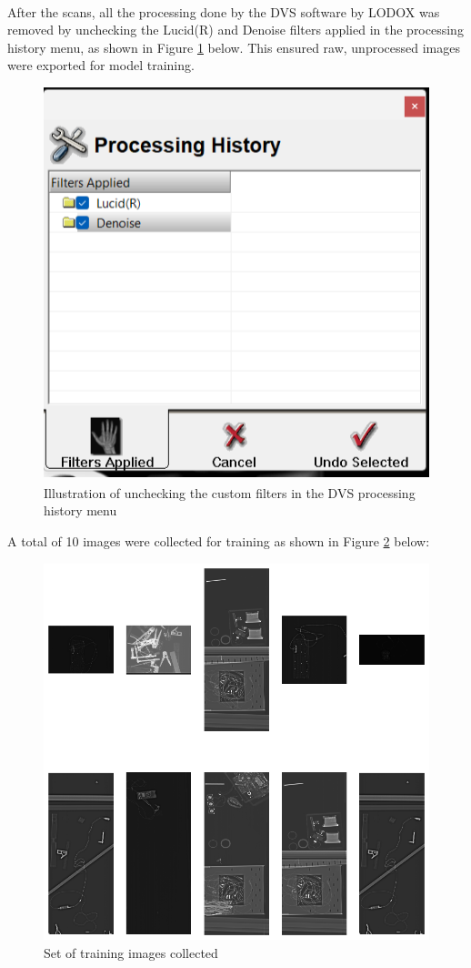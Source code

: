 After the scans, all the processing done by the DVS\textsuperscript{\textregistered} software by LODOX\textsuperscript{\textregistered} was removed by unchecking the Lucid(R) and Denoise filters applied in the processing history menu, as shown in Figure \ref{fig:menu} below. This ensured raw, unprocessed images were exported for model training. 

\begin{figure}[h!]
    \centering
    \includegraphics[width=0.64\linewidth]{3_Chapters//3_Chapter_Methodology//Figures/Filteruncheck.png}
    \caption{Illustration of unchecking the custom filters in the DVS\textsuperscript{\textregistered} processing history menu}
    \label{fig:menu}
\end{figure}

A total of 10 images were collected for training as shown in Figure \ref{fig:trainingset} below:
\begin{figure}[h!]
    \centering
    \includegraphics[width=0.7\linewidth]{3_Chapters//3_Chapter_Methodology//Figures/Training Images grid.png}
    \caption{Set of training images collected}
    \label{fig:trainingset}
\end{figure}

